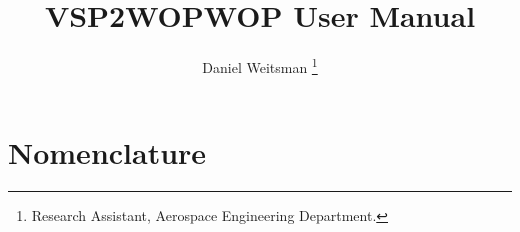 \documentclass[journal ]{new-aiaa}
\title{VSP2WOPWOP User Manual}
\author{Daniel Weitsman \footnote{Research Assistant, Aerospace Engineering Department.}}
\affil{Pennsylvania State University, University Park, PA, 16802}
\begin{document}
\maketitle

%



\section*{Nomenclature}

%
\end{document}
